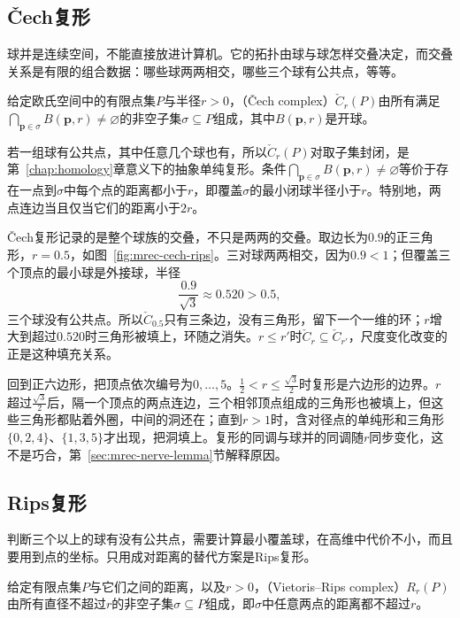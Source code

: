 \subsection{Čech复形}
\label{sec:mrec-cech}

球并是连续空间，不能直接放进计算机。它的拓扑由球与球怎样交叠决定，而交叠关系是有限的组合数据：哪些球两两相交，哪些三个球有公共点，等等。

\begin{definition}[Čech复形]
\label{def:mrec-cech}
给定欧氏空间中的有限点集$P$与半径$r>0$，（Čech complex）$\check C_r(P)$由所有满足$\bigcap_{\bm p\in\sigma}B(\bm p,r)\neq\varnothing$的非空子集$\sigma\subseteq P$组成，其中$B(\bm p,r)$是开球。
\end{definition}

若一组球有公共点，其中任意几个球也有，所以$\check C_r(P)$对取子集封闭，是第~\ref{chap:homology}章意义下的抽象单纯复形。条件$\bigcap_{\bm p\in\sigma}B(\bm p,r)\neq\varnothing$等价于存在一点到$\sigma$中每个点的距离都小于$r$，即覆盖$\sigma$的最小闭球半径小于$r$。特别地，两点连边当且仅当它们的距离小于$2r$。

Čech复形记录的是整个球族的交叠，不只是两两的交叠。取边长为$0.9$的正三角形，$r=0.5$，如图~\ref{fig:mrec-cech-rips}。三对球两两相交，因为$0.9<1$；但覆盖三个顶点的最小球是外接球，半径
\[
 \frac{0.9}{\sqrt3}\approx0.520>0.5,
\]
三个球没有公共点。所以$\check C_{0.5}$只有三条边，没有三角形，留下一个一维的环；$r$增大到超过$0.520$时三角形被填上，环随之消失。$r\leq r'$时$\check C_r\subseteq\check C_{r'}$，尺度变化改变的正是这种填充关系。

回到正六边形，把顶点依次编号为$0,\ldots,5$。$\tfrac12<r\leq\tfrac{\sqrt3}2$时复形是六边形的边界。$r$超过$\tfrac{\sqrt3}2$后，隔一个顶点的两点连边，三个相邻顶点组成的三角形也被填上，但这些三角形都贴着外圈，中间的洞还在；直到$r>1$时，含对径点的单纯形和三角形$\{0,2,4\}$、$\{1,3,5\}$才出现，把洞填上。复形的同调与球并的同调随$r$同步变化，这不是巧合，第~\ref{sec:mrec-nerve-lemma}节解释原因。

\subsection{Rips复形}
\label{sec:mrec-rips}

判断三个以上的球有没有公共点，需要计算最小覆盖球，在高维中代价不小，而且要用到点的坐标。只用成对距离的替代方案是Rips复形。

\begin{definition}[Rips复形]
\label{def:mrec-rips}
给定有限点集$P$与它们之间的距离，以及$r>0$，（Vietoris--Rips complex）$R_r(P)$由所有直径不超过$r$的非空子集$\sigma\subseteq P$组成，即$\sigma$中任意两点的距离都不超过$r$。
\end{definition}


